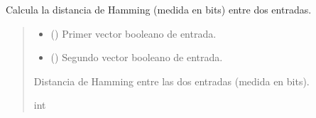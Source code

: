 \documentclass[letterpaper,10pt,english]{sphinxmanual}
\begin{document}
\begin{fulllineitems}
\label{\detokenize{myutils:myutils.bool.hamming}}
\pysigstartsignatures
{}
\pysigstopsignatures
\sphinxAtStartPar
Calcula la distancia de Hamming (medida en bits) entre dos entradas.
\begin{quote}\begin{description}
\begin{itemize}
\item {} 
\sphinxAtStartPar
{} () \textendash{} Primer vector booleano de entrada.

\item {} 
\sphinxAtStartPar
{} () \textendash{} Segundo vector booleano de entrada.

\end{itemize}

\sphinxAtStartPar
Distancia de Hamming entre las dos entradas (medida en bits).

\sphinxAtStartPar
int

\end{description}\end{quote}

\end{fulllineitems}

\end{document}
